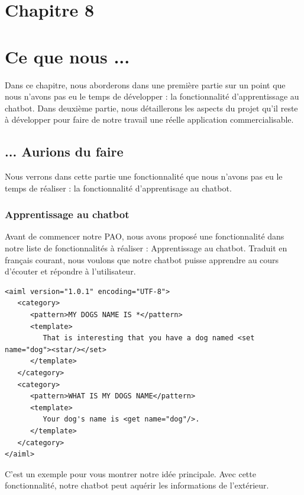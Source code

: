 \section*{Chapitre 8}
\section{Ce que nous ...}
\indent Dans ce chapitre, nous aborderons dans une première partie sur un point que nous n'avons pas eu le temps de développer :  la fonctionnalité d’apprentissage au chatbot. Dans deuxième partie, nous détaillerons les aspects du projet qu'il reste à développer pour faire de notre travail une réelle application commercialisable.

\subsection{... Aurions du faire}
\indent Nous verrons dans cette partie une fonctionnalité que nous n'avons pas eu le temps de réaliser : la fonctionnalité d'apprentisage au chatbot.

\subsubsection{Apprentissage au chatbot}
\indent Avant de commencer notre PAO, nous avons proposé une fonctionnalité dans notre liste de fonctionnalités à réaliser : Apprentissage au chatbot. Traduit en français courant, nous voulons que notre chatbot puisse apprendre au cours d'écouter et répondre à l'utilisateur. 

\begin{lstlisting}[frame=none,aboveskip=0.5em]
<aiml version="1.0.1" encoding="UTF-8">
   <category>
      <pattern>MY DOGS NAME IS *</pattern>
      <template>
         That is interesting that you have a dog named <set name="dog"><star/></set>
      </template>  
   </category>  
   <category>
      <pattern>WHAT IS MY DOGS NAME</pattern>
      <template>
         Your dog's name is <get name="dog"/>.
      </template>  
   </category>  
</aiml>
\end{lstlisting}

\indent C'est un exemple pour vous montrer notre idée principale. Avec cette fonctionnalité, notre chatbot peut aquérir les informations de l'extérieur.

